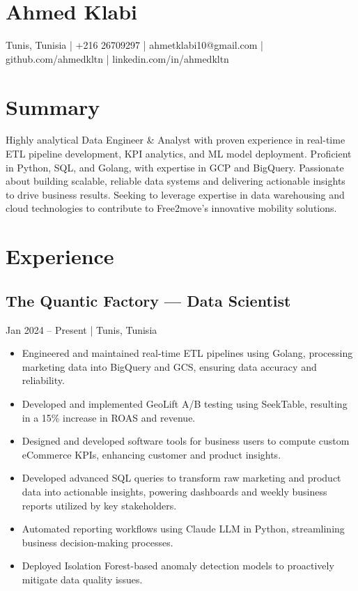 \documentclass[11pt]{article}
\begin{document}
\vspace{0.5cm}

\section*{Ahmed Klabi}
Tunis, Tunisia | +216 26709297 | ahmetklabi10@gmail.com | github.com/ahmedkltn | linkedin.com/in/ahmedkltn

\section*{Summary}
Highly analytical Data Engineer & Analyst with proven experience in real-time ETL pipeline development, KPI analytics, and ML model deployment.  Proficient in Python, SQL, and Golang, with expertise in GCP and BigQuery.  Passionate about building scalable, reliable data systems and delivering actionable insights to drive business results.  Seeking to leverage expertise in data warehousing and cloud technologies to contribute to Free2move's innovative mobility solutions.

\section*{Experience}
\subsection*{The Quantic Factory — Data Scientist}
Jan 2024 – Present | Tunis, Tunisia

\begin{itemize}
    \item Engineered and maintained real-time ETL pipelines using Golang, processing marketing data into BigQuery and GCS, ensuring data accuracy and reliability.
    \item Developed and implemented GeoLift A/B testing using SeekTable, resulting in a 15\% increase in ROAS and revenue.
    \item Designed and developed software tools for business users to compute custom eCommerce KPIs, enhancing customer and product insights.
    \item Developed advanced SQL queries to transform raw marketing and product data into actionable insights, powering dashboards and weekly business reports utilized by key stakeholders.
    \item Automated reporting workflows using Claude LLM in Python, streamlining business decision-making processes.
    \item Deployed Isolation Forest-based anomaly detection models to proactively mitigate data quality issues.
\end{itemize}
\end{document}
